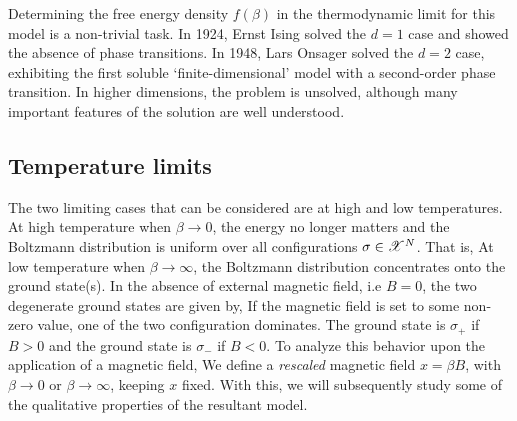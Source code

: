 \documentclass[letterpaper,english,10pt]{article}
\begin{document}
Determining the free energy density $f(\beta)$ in the thermodynamic limit for this model is a non-trivial task. In 1924, Ernst Ising solved the $d=1$ case and showed the absence of phase transitions. 
In 1948, Lars Onsager solved the $d=2$ case, exhibiting the first soluble `finite-dimensional' model with a second-order phase transition. 
In higher dimensions, the problem is unsolved, although many important features of the solution are well understood.

\subsection{Temperature limits}
The two limiting cases that can be considered are at high and low temperatures. 
At high temperature when $\beta \to 0$, the energy no longer matters and the Boltzmann distribution is uniform over all configurations $\sigma \in \mathscr{X}^N$. 
That is, 
At low temperature when $\beta \to \infty$, 
the Boltzmann distribution concentrates onto the ground state(s). 
In the absence of external magnetic field, i.e $B=0$, the two degenerate ground states are given by,
If the magnetic field is set to some non-zero value, one of the two configuration dominates. 
The ground state is $\sigma_+$ if $B>0$ and the ground state is $\sigma_-$ if $B<0$.
%
To analyze this behavior upon the application of a magnetic field, 
We define a \textit{rescaled} magnetic field $x=\beta B$, with $\beta \to 0$ or $\beta \to \infty$, keeping $x$ fixed. 
With this, we will subsequently study some of the qualitative properties of the resultant model.
\end{document}
